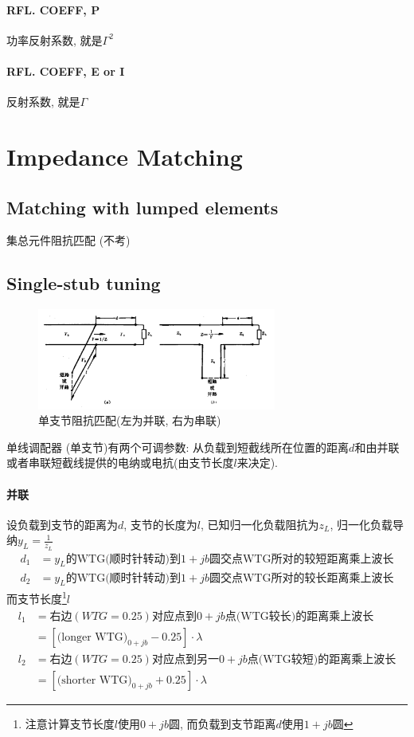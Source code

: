 \documentclass[a4paper]{report}
\begin{document}
\paragraph{RFL. COEFF, P}功率反射系数, 就是$\Gamma^2$
\paragraph{RFL. COEFF, E or I}反射系数, 就是$\Gamma$

\section{Impedance Matching}
\subsection{Matching with lumped elements}
集总元件阻抗匹配 (不考)
\subsection{Single-stub tuning}
\begin{figure}[H]
\centering
\includegraphics[width=0.7\textwidth]{stun.png}
\caption{单支节阻抗匹配(左为并联, 右为串联)}
\end{figure}

单线调配器 (单支节)有两个可调参数: 从负载到短截线所在位置的距离$d$和由并联或者串联短截线提供的电纳或电抗(由支节长度$l$来决定). 

\paragraph{并联} 设负载到支节的距离为$d$, 支节的长度为$l$, 已知归一化负载阻抗为$z_L$, 归一化负载导纳$y_L=\frac{1}{z_L}$
\begin{align*}
  d_1&=\text{$y_L$的WTG(顺时针转动)到$1+jb$圆交点WTG所对的较短距离乘上波长}
  \\ d_2&=\text{$y_L$的WTG(顺时针转动)到$1+jb$圆交点WTG所对的较长距离乘上波长}
\end{align*}
而支节长度\footnote{注意计算支节长度$l$使用$0+jb$圆, 而负载到支节距离$d$使用$1+jb$圆}$l$
\begin{align*}
  l_1&=\text{右边$(WTG=0.25)$对应点到$0+jb$点(WTG较长)的距离乘上波长}
  \\ &=[\text{(longer WTG)}_{0+jb}-0.25]\cdot \lambda
  \\ l_2&=\text{右边$(WTG=0.25)$对应点到另一$0+jb$点(WTG较短)的距离乘上波长}
  \\ &=[\text{(shorter WTG)}_{0+jb}+0.25]\cdot \lambda
\end{align*}
\end{document}
